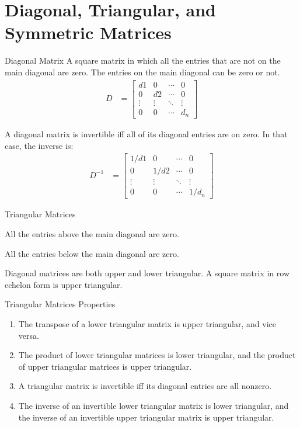 \documentclass[\main/notes.tex]{subfiles}
\begin{document}
		\section[Special Matrix Types]{Diagonal, Triangular, and Symmetric Matrices}
			\begin{definition}{Diagonal Matrix}
				A square matrix in which all the entries that are not on the main diagonal are zero. The entries on the main diagonal can be zero or not.
				\begin{align*}
					D &= \begin{bmatrix}
						d1 & 0 & \cdots & 0\\
						0 & d2 & \cdots & 0\\
						\vdots & \vdots & \ddots & \vdots\\
						0 & 0 & \cdots & d_{n}
					\end{bmatrix}
				\end{align*}

				A diagonal matrix is invertible iff all of its diagonal entries are on zero. In that case, the inverse is:
				\begin{align*}
					D^{-1} &= \begin{bmatrix}
						1/d1 & 0 & \cdots & 0\\
						0 & 1/d2 & \cdots & 0\\
						\vdots & \vdots & \ddots & \vdots\\
						0 & 0 & \cdots & 1/d_{n}
					\end{bmatrix}
				\end{align*}
			\end{definition}
			\begin{definition}{Triangular Matrices}
				\begin{description}[nosep]
					\item[Lower triangular] All the entries above the main diagonal are zero.
					\item[Upper triangular] All the entries below the main diagonal are zero.
				\end{description}

				Diagonal matrices are both upper and lower triangular. A square matrix in row echelon form is upper triangular.
			\end{definition}
			\begin{sidenote}{Triangular Matrices Properties}
				\begin{enumerate}[label=(\alph*), nosep]
					\item The transpose of a lower triangular matrix is upper triangular, and vice versa.
					\item The product of lower triangular matrices is lower triangular, and the product of upper triangular matrices is upper triangular.
					\item A triangular matrix is invertible iff its diagonal entries are all nonzero.
					\item The inverse of an invertible lower triangular matrix is lower triangular, and the inverse of an invertible upper triangular matrix is upper triangular.
				\end{enumerate}
			\end{sidenote}
\end{document}
